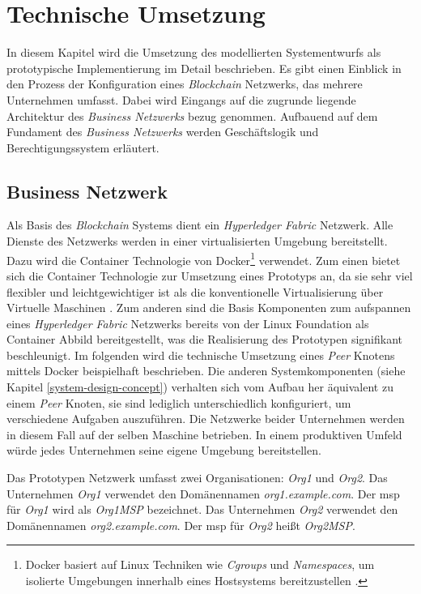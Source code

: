 \section{Technische Umsetzung} \label{sec:technical-implementation}
In diesem Kapitel wird die Umsetzung des modellierten Systementwurfs als prototypische Implementierung im Detail beschrieben. Es gibt einen Einblick in den Prozess der Konfiguration eines \textit{Blockchain} Netzwerks, das mehrere Unternehmen umfasst. Dabei wird Eingangs auf die zugrunde liegende Architektur des \textit{Business Netzwerks} bezug genommen. Aufbauend auf dem Fundament des \textit{Business Netzwerks} werden Geschäftslogik und Berechtigungssystem erläutert.

\subsection{Business Netzwerk}
Als Basis des \textit{Blockchain} Systems dient ein \textit{Hyperledger Fabric} Netzwerk. Alle Dienste des Netzwerks werden in einer virtualisierten Umgebung bereitstellt. Dazu wird die Container Technologie von Docker\footnote{Docker basiert auf Linux Techniken wie \textit{Cgroups} und \textit{Namespaces}, um isolierte Umgebungen innerhalb eines Hostsystems bereitzustellen \citep{Bengel2008,Oeggl2019}.} verwendet. Zum einen bietet sich die Container Technologie zur Umsetzung eines Prototyps an, da sie sehr viel flexibler und leichtgewichtiger ist als die konventionelle Virtualisierung über Virtuelle Maschinen \citep{Ahmed2018}. Zum anderen sind die Basis Komponenten zum aufspannen eines \textit{Hyperledger Fabric} Netzwerks bereits von der Linux Foundation als Container Abbild bereitgestellt, was die Realisierung des Prototypen signifikant beschleunigt. Im folgenden wird die technische Umsetzung eines \textit{Peer} Knotens mittels Docker beispielhaft beschrieben. Die anderen Systemkomponenten (siehe Kapitel \ref{system-design-concept}) verhalten sich vom Aufbau her äquivalent zu einem \textit{Peer} Knoten, sie sind lediglich unterschiedlich konfiguriert, um verschiedene Aufgaben auszuführen. Die Netzwerke beider Unternehmen werden in diesem Fall auf der selben Maschine betrieben. In einem produktiven Umfeld würde jedes Unternehmen seine eigene Umgebung bereitstellen.

Das Prototypen Netzwerk umfasst zwei Organisationen: \textit{Org1} und \textit{Org2}. Das Unternehmen \textit{Org1} verwendet den Domänennamen \textit{org1.example.com}. Der \acf{msp} für \textit{Org1} wird als \textit{Org1MSP} bezeichnet. Das Unternehmen \textit{Org2} verwendet den Domänennamen \textit{org2.example.com}. Der \acf{msp} für \textit{Org2} heißt \textit{Org2MSP}.

